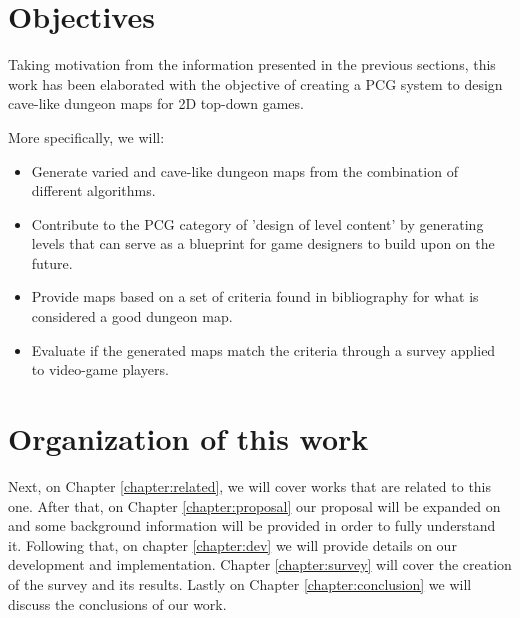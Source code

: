 \section{Objectives}
\label{sec:objectives}

Taking motivation from the information presented in the previous sections, this work has been elaborated with the objective of creating a PCG system to design cave-like dungeon maps for 2D top-down games.

More specifically, we will:

\begin{itemize}
\item \textbf{} Generate varied and cave-like dungeon maps from the combination of different algorithms.

\item \textbf{} Contribute to the PCG category of 'design of level content' by generating levels that can serve as a blueprint for game designers to build upon on the future.

\item \textbf{} Provide maps based on a set of criteria found in bibliography for what is considered a good dungeon map.

\item \textbf{} Evaluate if the generated maps match the criteria through a survey applied to video-game players.

\end{itemize}

\section{Organization of this work}

Next, on Chapter \ref{chapter:related}, we will cover works that are related to this one. After that, on Chapter \ref{chapter:proposal} our proposal will be expanded on and some background information will be provided in order to fully understand it. Following that, on chapter \ref{chapter:dev} we will provide details on our development and implementation. Chapter \ref{chapter:survey} will cover the creation of the survey and its results. Lastly on Chapter \ref{chapter:conclusion} we will discuss the conclusions of our work.

